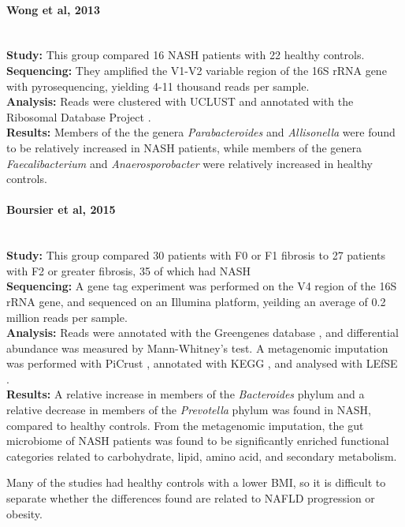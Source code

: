 \paragraph{Wong et al, 2013 \cite{wong2013molecular}}\mbox{}\\
\textbf{Study:} This group compared 16 NASH patients with 22 healthy controls.\\
\textbf{Sequencing:} They amplified the V1-V2 variable region of the 16S rRNA gene with pyrosequencing, yielding 4-11 thousand reads per sample.\\
\textbf{Analysis:} Reads were clustered with UCLUST \cite{edgar2010search} and annotated with the Ribosomal Database Project \cite{cole2009ribosomal}.\\
\textbf{Results:} Members of the the genera \textit{Parabacteroides} and \textit{Allisonella} were found to be relatively increased in NASH patients, while members of the genera \textit{Faecalibacterium} and \textit{Anaerosporobacter} were relatively increased in healthy controls.

\paragraph{Boursier et al, 2015 \cite{boursier2016severity}}\mbox{}\\
\textbf{Study:} This group compared 30 patients with F0 or F1 fibrosis to 27 patients with F2 or greater fibrosis, 35 of which had NASH\\
\textbf{Sequencing:} A gene tag experiment was performed on the V4 region of the 16S rRNA gene, and sequenced on an Illumina platform, yeilding an average of 0.2 million reads per sample.\\
\textbf{Analysis:} Reads were annotated with the Greengenes database \cite{desantis2006greengenes}, and differential abundance was measured by Mann-Whitney's test. A metagenomic imputation was performed with PiCrust \cite{langille2013predictive}, annotated with KEGG \cite{kanehisa2000kegg}, and analysed with LEfSE \cite{segata2011metagenomic}.\\
\textbf{Results:} A relative increase in members of the \textit{Bacteroides} phylum and a relative decrease in members of the \textit{Prevotella} phylum was found in NASH, compared to healthy controls. From the metagenomic imputation, the gut microbiome of NASH patients was found to be significantly enriched functional categories related to carbohydrate, lipid, amino acid, and secondary metabolism.

Many of the studies had healthy controls with a lower BMI, so it is difficult to separate whether the differences found are related to NAFLD progression or obesity.

